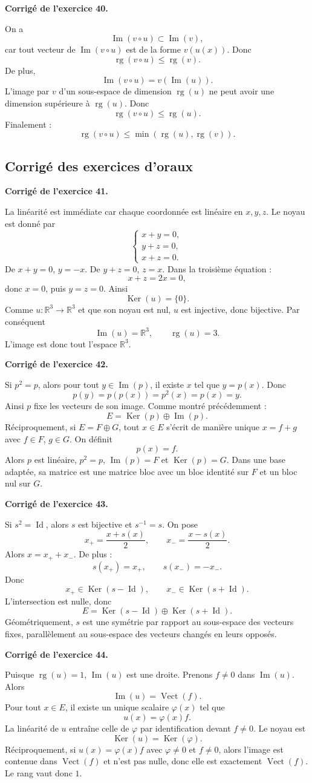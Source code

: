 \documentclass[11pt,a4paper]{article}
\newcommand{\corr}[1]{
    \vspace{0.4cm}
    \noindent\textbf{\textcolor{bleuprepa}{Corrigé de l'exercice #1.}}
    \par\vspace{0.1cm}
}
\newcommand{\R}{\mathbb{R}}
\newcommand{\Ker}{\operatorname{Ker}}
\newcommand{\Img}{\operatorname{Im}}
\newcommand{\rg}{\operatorname{rg}}
\newcommand{\Vect}{\operatorname{Vect}}
\newcommand{\Id}{\operatorname{Id}}
\begin{document}
\corr{40}
On a
\[
\Img(v\circ u)\subset \Img(v),
\]
car tout vecteur de $\Img(v\circ u)$ est de la forme $v(u(x))$. Donc
\[
\rg(v\circ u)\leq \rg(v).
\]
De plus,
\[
\Img(v\circ u)=v(\Img(u)).
\]
L'image par $v$ d'un sous-espace de dimension $\rg(u)$ ne peut avoir une dimension supérieure à $\rg(u)$. Donc
\[
\rg(v\circ u)\leq \rg(u).
\]
Finalement :
\[
\rg(v\circ u)\leq \min(\rg(u),\rg(v)).
\]

\subsection{Corrigé des exercices d'oraux}

\corr{41}
La linéarité est immédiate car chaque coordonnée est linéaire en $x,y,z$. Le noyau est donné par
\[
\begin{cases}
x+y=0,\\
y+z=0,\\
x+z=0.
\end{cases}
\]
De $x+y=0$, $y=-x$. De $y+z=0$, $z=x$. Dans la troisième équation :
\[
x+z=2x=0,
\]
donc $x=0$, puis $y=z=0$. Ainsi
\[
\Ker(u)=\{0\}.
\]
Comme $u:\R^3\to\R^3$ et que son noyau est nul, $u$ est injective, donc bijective. Par conséquent
\[
\Img(u)=\R^3,\qquad \rg(u)=3.
\]
L'image est donc tout l'espace $\R^3$.

\corr{42}
Si $p^2=p$, alors pour tout $y\in\Img(p)$, il existe $x$ tel que $y=p(x)$. Donc
\[
p(y)=p(p(x))=p^2(x)=p(x)=y.
\]
Ainsi $p$ fixe les vecteurs de son image. Comme montré précédemment :
\[
E=\Ker(p)\oplus\Img(p).
\]
Réciproquement, si $E=F\oplus G$, tout $x\in E$ s'écrit de manière unique $x=f+g$ avec $f\in F$, $g\in G$. On définit
\[
p(x)=f.
\]
Alors $p$ est linéaire, $p^2=p$, $\Img(p)=F$ et $\Ker(p)=G$. Dans une base adaptée, sa matrice est une matrice bloc avec un bloc identité sur $F$ et un bloc nul sur $G$.

\corr{43}
Si $s^2=\Id$, alors $s$ est bijective et $s^{-1}=s$. On pose
\[
x_+=\frac{x+s(x)}2,\qquad x_-=\frac{x-s(x)}2.
\]
Alors $x=x_++x_-$. De plus :
\[
s(x_+)=x_+,\qquad s(x_-)=-x_-.
\]
Donc
\[
x_+\in\Ker(s-\Id),\qquad x_-\in\Ker(s+\Id).
\]
L'intersection est nulle, donc
\[
E=\Ker(s-\Id)\oplus\Ker(s+\Id).
\]
Géométriquement, $s$ est une symétrie par rapport au sous-espace des vecteurs fixes, parallèlement au sous-espace des vecteurs changés en leurs opposés.

\corr{44}
Puisque $\rg(u)=1$, $\Img(u)$ est une droite. Prenons $f\neq0$ dans $\Img(u)$. Alors
\[
\Img(u)=\Vect(f).
\]
Pour tout $x\in E$, il existe un unique scalaire $\varphi(x)$ tel que
\[
u(x)=\varphi(x)f.
\]
La linéarité de $u$ entraîne celle de $\varphi$ par identification devant $f\neq0$. Le noyau est
\[
\Ker(u)=\Ker(\varphi).
\]
Réciproquement, si $u(x)=\varphi(x)f$ avec $\varphi\neq0$ et $f\neq0$, alors l'image est contenue dans $\Vect(f)$ et n'est pas nulle, donc elle est exactement $\Vect(f)$. Le rang vaut donc $1$.
\end{document}
